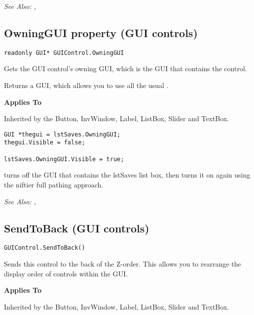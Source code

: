 \it{See Also:} , 



\subsection{OwningGUI property (GUI controls)}\label{GUIControl.OwningGUI}%

\begin{verbatim}
readonly GUI* GUIControl.OwningGUI
\end{verbatim}
Gets the GUI control's owning GUI, which is the GUI that contains the control.

Returns a GUI, which allows you to use all the usual
.

\bf{Applies To}

Inherited by the Button, InvWindow, Label, ListBox, Slider and TextBox.

\begin{verbatim}
GUI *thegui = lstSaves.OwningGUI;
thegui.Visible = false;

lstSaves.OwningGUI.Visible = true;
\end{verbatim}
turns off the GUI that contains the lstSaves list box, then turns it on again using
the niftier full pathing approach.

\it{See Also:} , 


\subsection{SendToBack (GUI controls)}\label{GUIControl.SendToBack}%

\begin{verbatim}
GUIControl.SendToBack()
\end{verbatim}
Sends this control to the back of the Z-order. This allows you to rearrange the display order
of controls within the GUI.

\bf{Applies To}

Inherited by the Button, InvWindow, Label, ListBox, Slider and TextBox.

